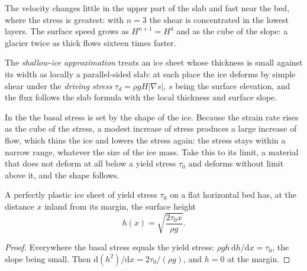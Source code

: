 The velocity changes little in the upper part of the slab and fast near the
bed, where the stress is greatest: with $n = 3$ the shear is concentrated in
the lowest layers. The surface speed grows as $H^{n+1} = H^4$ and as the
cube of the slope: a glacier twice as thick flows sixteen times faster.

\begin{definition}\label{def:b3:glaciology:sia}
The \emph{shallow-ice approximation} treats
an ice sheet whose thickness is small against its width as locally a
parallel-sided slab: at each place the ice deforms by simple shear under
the \emph{driving stress} $\tau_d = \rho gH|\nabla s|$, $s$ being the
surface elevation, and the flux follows the slab formula with the local
thickness and surface slope.
\end{definition}

In the  the basal stress is set by the shape of
the ice. Because the strain rate rises as the cube of the stress, a modest
increase of stress produces a large increase of flow, which thins the ice
and lowers the stress again: the stress stays within a narrow range,
whatever the size of the ice mass. Take this to its limit, a material that
does not deform at all below a yield stress $\tau_0$ and deforms without
limit above it, and the shape follows.

\begin{proposition}\label{prop:b3:glaciology:nye}
A perfectly plastic ice sheet of yield stress $\tau_0$ on a flat horizontal
bed has, at the distance $x$ inland from its margin, the surface height
\[
h(x) = \sqrt{\frac{2\tau_0x}{\rho g}} .
\]
\end{proposition}

\begin{proof}
Everywhere the basal stress equals the yield stress: $\rho gh\,\mathrm
dh/\mathrm dx = \tau_0$, the slope being small. Then $\mathrm d(h^2)/\mathrm
dx = 2\tau_0/(\rho g)$, and $h = 0$ at the margin.
\end{proof}

